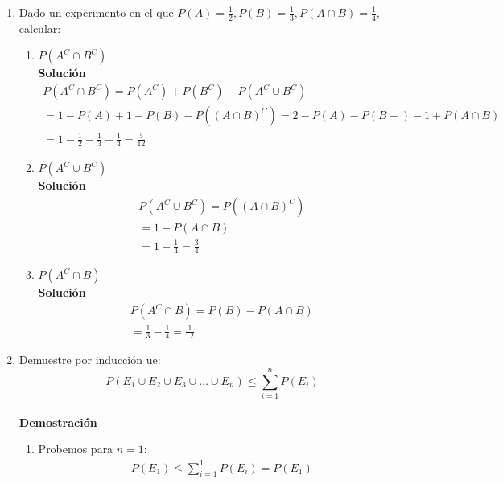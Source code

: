 \begin{enumerate}
    \item Dado un experimento en el que $P(A) = \frac{1}{2}, P(B) = \frac{1}{3}, P(A \cap B) = \frac{1}{4}$, calcular:
    \begin{enumerate}
        \item $P(A^C \cap B^C)$
        \\\textbf{Solución}
        \begin{gather*}
        P(A^C \cap B^C) = P(A^C) + P(B^C) - P(A^C \cup B^C) \\
        = 1 - P(A) + 1 - P(B) - P((A \cap B)^C) = 2 - P(A) - P(B-) - 1 + P(A \cap B) \\
        = 1 - \frac{1}{2} - \frac{1}{3} + \frac{1}{4} = \frac{5}{12}
        \end{gather*}
        
        \item $P(A^C \cup B^C)$
        \\\textbf{Solución}
        \begin{gather*}
        P(A^C \cup B^C) = P((A \cap B)^C) \\
        = 1 - P(A \cap B) \\
        = 1 - \frac{1}{4} = \frac{3}{4}
        \end{gather*}
        
        \item $P(A^C \cap B)$
        \\\textbf{Solución}
        \begin{gather*}
        P(A^C \cap B) = P(B) - P(A \cap B) \\
        = \frac{1}{3} - \frac{1}{4} = \frac{1}{12}
        \end{gather*}
        
    \end{enumerate}
    
    \item Demuestre por inducción  ue: $$P(E_1 \cup E_2 \cup E_3 \cup \ldots \cup E_n) \leq \sum_{i=1}^{n} P(E_i)$$
    \\\textbf{Demostración}
    \begin{enumerate}
        \item Probemos para $n=1$:
        \begin{gather*}
        P(E_1) \leq \sum_{i=1}^{1} P(E_i) = P(E_1)
        \end{gather*}
        

\end{enumerate}
\end{enumerate}
